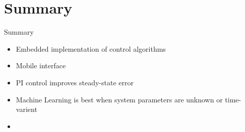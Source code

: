 \documentclass{beamer}
\begin{document}
\section*{Summary}
\begin{frame}{Summary} %
  \begin{itemize}
    \item Embedded implementation of control algorithms
    \item Mobile interface
    \item PI control improves steady-state error
    \item Machine Learning is best when system parameters are unknown or time-varient
    \item{}
  \end{itemize}
  
\end{frame}
  
\end{document}
